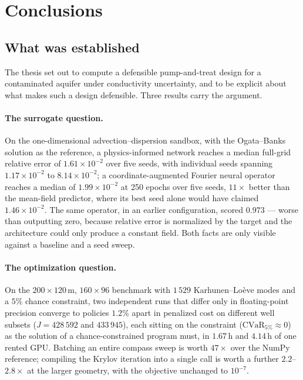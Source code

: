 
\section{Conclusions}
\subsection{What was established}

The thesis set out to compute a defensible pump-and-treat design for a
contaminated aquifer under conductivity uncertainty, and to be explicit about
what makes such a design defensible. Three results carry the argument.

\paragraph{The surrogate question.} On the one-dimensional advection--dispersion
sandbox, with the Ogata--Banks solution as the reference, a physics-informed
network reaches a median full-grid relative error of $1.61\times10^{-2}$ over
five seeds, with individual seeds spanning $1.17\times10^{-2}$ to
$8.14\times10^{-2}$; a coordinate-augmented Fourier neural operator reaches a
median of $1.99\times10^{-2}$ at 250 epochs over five seeds, $11\times$ better
than the mean-field predictor, where its best seed alone would have claimed
$1.46\times10^{-2}$. The same operator, in an earlier configuration, scored
$0.973$ --- worse than outputting zero, because relative error is normalized by
the target and the architecture could only produce a constant field. Both facts
are only visible against a baseline and a seed sweep.

\paragraph{The optimization question.} On the $200\times120$\,m, $160\times96$
benchmark with $1\,529$ Karhunen--Lo\`eve modes and a $5\%$ chance constraint,
two independent runs that differ only in floating-point precision converge to
policies $1.2\%$ apart in penalized cost on different well subsets
($J = 428\,592$ and $433\,945$), each sitting on the constraint
($\mathrm{CVaR}_{5\%}\approx 0$) as the solution of a chance-constrained program
must, in $1.67$\,h and $4.14$\,h of one rented GPU. Batching an entire compass
sweep is worth $47\times$ over the NumPy reference; compiling the Krylov
iteration into a single call is worth a further $2.2$--$2.8\times$ at the larger
geometry, with the objective unchanged to $10^{-7}$.


